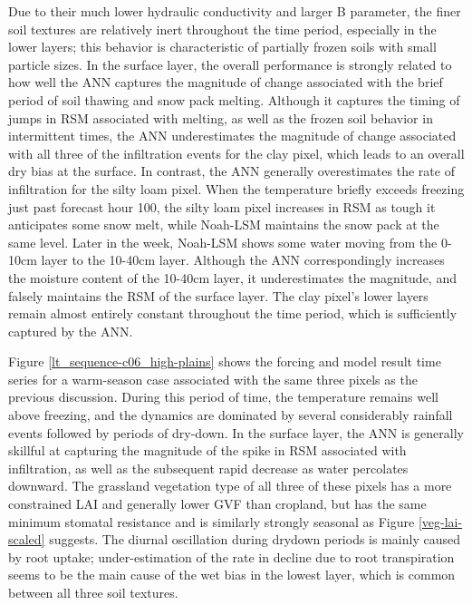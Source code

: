 Due to their much lower hydraulic conductivity and larger B parameter, the finer soil textures are relatively inert throughout the time period, especially in the lower layers; this behavior is characteristic of partially frozen soils with small particle sizes. In the surface layer, the overall performance is strongly related to how well the ANN captures the magnitude of change associated with the brief period of soil thawing and snow pack melting. Although it captures the timing of jumps in RSM associated with melting, as well as the frozen soil behavior in intermittent times, the ANN underestimates the magnitude of change associated with all three of the infiltration events for the clay pixel, which leads to an overall dry bias at the surface. In contrast, the ANN generally overestimates the rate of infiltration for the silty loam pixel. When the temperature briefly exceeds freezing just past forecast hour 100, the silty loam pixel increases in RSM as tough it anticipates some snow melt, while Noah-LSM maintains the snow pack at the same level. Later in the week, Noah-LSM shows some water moving from the 0-10cm layer to the 10-40cm layer. Although the ANN correspondingly increases the moisture content of the 10-40cm layer, it underestimates the magnitude, and falsely maintains the RSM of the surface layer. The clay pixel's lower layers remain almost entirely constant throughout the time period, which is sufficiently captured by the ANN.

Figure \ref{lt_sequence-c06_high-plains} shows the forcing and model result time series for a warm-season case associated with the same three pixels as the previous discussion. During this period of time, the temperature remains well above freezing, and the dynamics are dominated by several considerably rainfall events followed by periods of dry-down. In the surface layer, the ANN is generally skillful at capturing the magnitude of the spike in RSM associated with infiltration, as well as the subsequent rapid decrease as water percolates downward. The grassland vegetation type of all three of these pixels has a more constrained LAI and generally lower GVF than cropland, but has the same minimum stomatal resistance and is similarly strongly seasonal as Figure \ref{veg-lai-scaled} suggests. The diurnal oscillation during drydown periods is mainly caused by root uptake; under-estimation of the rate in decline due to root transpiration seems to be the main cause of the wet bias in the lowest layer, which is common between all three soil textures.

